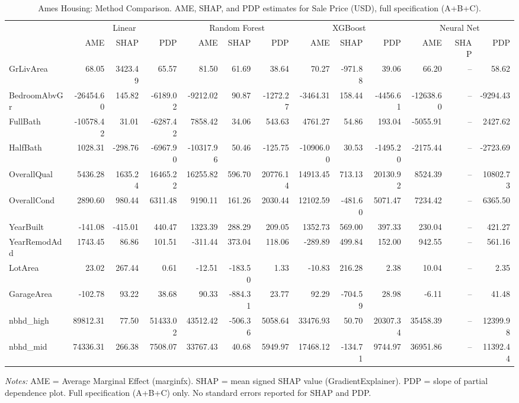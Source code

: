 \begin{table}[htbp]
\centering
\small
\begin{threeparttable}
\caption{Ames Housing: Method Comparison. AME, SHAP, and PDP estimates for Sale Price (USD), full specification (A+B+C).}
\label{tab:ames_housing_method_comparison}
\begin{tabular}{lrrrrrrrrrrrr}
\toprule
 & \multicolumn{3}{c}{Linear} & \multicolumn{3}{c}{Random Forest} & \multicolumn{3}{c}{XGBoost} & \multicolumn{3}{c}{Neural Net} \\
\cmidrule(lr){2-4} \cmidrule(lr){5-7} \cmidrule(lr){8-10} \cmidrule(lr){11-13} 
 & AME & SHAP & PDP & AME & SHAP & PDP & AME & SHAP & PDP & AME & SHAP & PDP \\
\midrule
GrLivArea & 68.05 & 3423.49 & 65.57 & 81.50 & 61.69 & 38.64 & 70.27 & -971.88 & 39.06 & 66.20 & -- & 58.62 \\
BedroomAbvGr & -26454.60 & 145.82 & -6189.02 & -9212.02 & 90.87 & -1272.27 & -3464.31 & 158.44 & -4456.61 & -12638.60 & -- & -9294.43 \\
FullBath & -10578.42 & 31.01 & -6287.42 & 7858.42 & 34.06 & 543.63 & 4761.27 & 54.86 & 193.04 & -5055.91 & -- & 2427.62 \\
HalfBath & 1028.31 & -298.76 & -6967.90 & -10317.96 & 50.46 & -125.75 & -10906.00 & 30.53 & -1495.20 & -2175.44 & -- & -2723.69 \\
\midrule
OverallQual & 5436.28 & 1635.24 & 16465.22 & 16255.82 & 596.70 & 20776.14 & 14913.45 & 713.13 & 20130.92 & 8524.39 & -- & 10802.73 \\
OverallCond & 2890.60 & 980.44 & 6311.48 & 9190.11 & 161.26 & 2030.44 & 12102.59 & -481.60 & 5071.47 & 7234.42 & -- & 6365.50 \\
YearBuilt & -141.08 & -415.01 & 440.47 & 1323.39 & 288.29 & 209.05 & 1352.73 & 569.00 & 397.33 & 230.04 & -- & 421.27 \\
YearRemodAdd & 1743.45 & 86.86 & 101.51 & -311.44 & 373.04 & 118.06 & -289.89 & 499.84 & 152.00 & 942.55 & -- & 561.16 \\
\midrule
LotArea & 23.02 & 267.44 & 0.61 & -12.51 & -183.50 & 1.33 & -10.83 & 216.28 & 2.38 & 10.04 & -- & 2.35 \\
GarageArea & -102.78 & 93.22 & 38.68 & 90.33 & -884.31 & 23.77 & 92.29 & -704.59 & 28.98 & -6.11 & -- & 41.48 \\
nbhd\_high & 89812.31 & 77.50 & 51433.02 & 43512.42 & -506.36 & 5058.64 & 33476.93 & 50.70 & 20307.34 & 35458.39 & -- & 12399.98 \\
nbhd\_mid & 74336.31 & 266.38 & 7508.07 & 33767.43 & 40.68 & 5949.97 & 17468.12 & -134.71 & 9744.97 & 36951.86 & -- & 11392.44 \\
\bottomrule
\end{tabular}
\begin{tablenotes}
\footnotesize
\item \textit{Notes:} AME = Average Marginal Effect (marginfx). SHAP = mean signed SHAP value (GradientExplainer). PDP = slope of partial dependence plot. Full specification (A+B+C) only. No standard errors reported for SHAP and PDP.
\end{tablenotes}
\end{threeparttable}
\end{table}